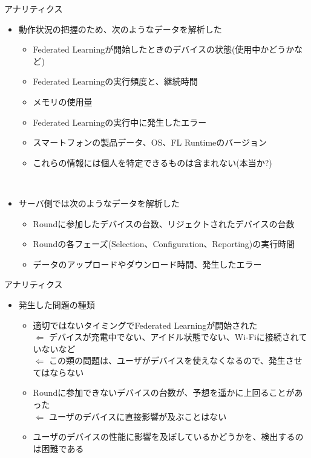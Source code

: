 \documentclass[dvipdfmx,notheorems,t]{beamer}
\begin{document}
\begin{frame}{アナリティクス}

\begin{itemize}
	\item 動作状況の把握のため、次のようなデータを解析した
	\begin{itemize}
		\item Federated Learningが開始したときのデバイスの状態(使用中かどうかなど)
		\item Federated Learningの実行頻度と、継続時間
		\item メモリの使用量
		\item Federated Learningの実行中に発生したエラー
		\item スマートフォンの製品データ、OS、FL Runtimeのバージョン
		\newline
		\item これらの情報には個人を特定できるものは含まれない(本当か?)
	\end{itemize} \
	
	\item サーバ側では次のようなデータを解析した
	\begin{itemize}
		\item Roundに参加したデバイスの台数、リジェクトされたデバイスの台数
		\item Roundの各フェーズ(Selection、Configuration、Reporting)の実行時間
		\item データのアップロードやダウンロード時間、発生したエラー
	\end{itemize}
\end{itemize}

\end{frame}

\begin{frame}{アナリティクス}

\begin{itemize}
	\item 発生した問題の種類
	\begin{itemize}
		\item 適切ではないタイミングでFederated Learningが開始された \\
		$\Leftarrow$ デバイスが充電中でない、アイドル状態でない、Wi-Fiに接続されていないなど \\
		$\Leftarrow$ この類の問題は、ユーザがデバイスを使えなくなるので、発生させてはならない
		\newline
		
		\item Roundに参加できないデバイスの台数が、予想を遥かに上回ることがあった \\
		$\Leftarrow$ ユーザのデバイスに直接影響が及ぶことはない
		\newline
		
		\item ユーザのデバイスの性能に影響を及ぼしているかどうかを、検出するのは困難である
	\end{itemize}
\end{itemize}

\end{frame}
\end{document}
